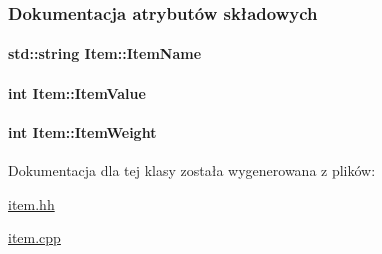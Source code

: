 \subsubsection{Dokumentacja atrybutów składowych}
\hypertarget{class_item_a7d8799886dca624982c8af6887adf916}{
\paragraph[{Item\-Name}]{\setlength{\rightskip}{0pt plus 5cm}std\-::string Item\-::\-Item\-Name\hspace{0.3cm}{\ttfamily [private]}}}\label{class_item_a7d8799886dca624982c8af6887adf916}
\hypertarget{class_item_ac6060c04d812737e6a0b57d593c6be98}{
\paragraph[{Item\-Value}]{\setlength{\rightskip}{0pt plus 5cm}int Item\-::\-Item\-Value\hspace{0.3cm}{\ttfamily [private]}}}\label{class_item_ac6060c04d812737e6a0b57d593c6be98}
\hypertarget{class_item_ad7b5016b5e5b378559b138dea750d92b}{
\paragraph[{Item\-Weight}]{\setlength{\rightskip}{0pt plus 5cm}int Item\-::\-Item\-Weight\hspace{0.3cm}{\ttfamily [private]}}}\label{class_item_ad7b5016b5e5b378559b138dea750d92b}


Dokumentacja dla tej klasy została wygenerowana z plików\-:\begin{DoxyCompactItemize}
\item 
\hyperlink{item_8hh}{item.\-hh}\item 
\hyperlink{item_8cpp}{item.\-cpp}\end{DoxyCompactItemize}
